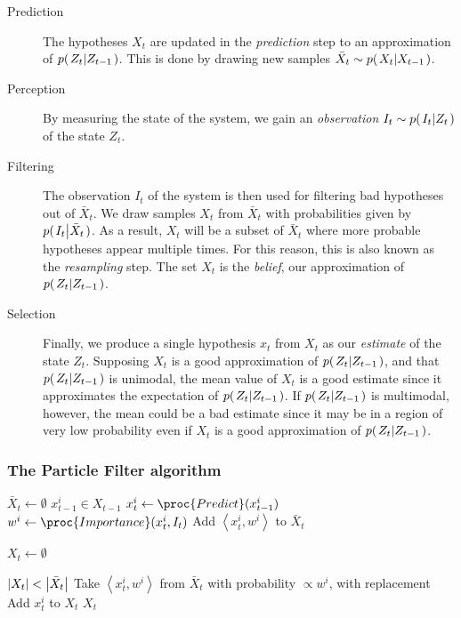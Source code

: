 \begin{description}

\item[Prediction] The hypotheses $X_t$ are updated in the \emph{prediction} step to an approximation of $p{(\left. Z_t \middle\vert Z_{t-1} \right.)}$. This is done by drawing new samples $\bar{X}_t \sim p{(\left. X_t \middle\vert X_{t-1} \right.)}$.
\item[Perception] By measuring the state of the system, we gain an \emph{observation} $I_t \sim p{(\left. I_t \middle\vert Z_t \right.)}$ of the state $Z_t$.
\item[Filtering] The observation $I_t$ of the system is then used for filtering bad hypotheses out of $\bar{X}_t$. We draw samples $X_t$ from $\bar{X}_t$ with probabilities given by $p{(\left. I_t \middle\vert \bar{X}_t \right.)}$. As a result, $X_t$ will be a subset of $\bar{X}_t$ where more probable hypotheses appear multiple times. For this reason, this is also known as the \emph{resampling} step. The set $X_t$ is the \emph{belief}, our approximation of $p{(\left. Z_t \middle\vert Z_{t-1} \right.)}$.
\item[Selection] Finally, we produce a single hypothesis $x_t$ from $X_t$ as our \emph{estimate} of the state $Z_t$. Supposing $X_t$ is a good approximation of $p{(\left. Z_t \middle\vert Z_{t-1} \right.)}$, and that $p{(\left. Z_t \middle\vert Z_{t-1} \right.)}$ is unimodal, the mean value of $X_t$ is a good estimate since it approximates the expectation of $p{(\left. Z_t \middle\vert Z_{t-1} \right.)}$. If $p{(\left. Z_t \middle\vert Z_{t-1} \right.)}$ is multimodal, however, the mean could be a bad estimate since it may be in a region of very low probability even if $X_t$ is a good approximation of $p{(\left. Z_t \middle\vert Z_{t-1} \right.)}$.
\end{description}

\subsubsection{The Particle Filter algorithm}
\begin{codebox}
\li $\bar{X}_t \gets \emptyset$
\li \ForEach $x_{t-1}^i \in X_{t-1}$
\li \Do
  \li $x_t^i \gets \proc{Predict}(x_{t-1}^i)$
  \li $w^i \gets \proc{Importance}(x_t^i,I_t)$
  \li Add $\left<x_t^i, w^i\right>$ to $\bar{X}_t$
\End
\li

\li $X_t \gets \emptyset$

\li \While $\left\vert X_t \right\vert < \left\vert \bar{X}_t \right\vert$
\li \Do
  \li Take $\left<x_t^i, w^i\right>$ from $\bar{X}_t$ with probability $\propto w^i$, with replacement
  \li Add $x_t^i$ to $X_t$
\End
\li \Return $X_t$
\end{codebox}



